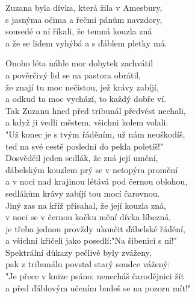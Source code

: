 
Zuzana byla dívka, která žila v Amesbury,\\
s jasnýma očima a řečmi pánům navzdory,\\
sousedé o ní říkali, že temná kouzla zná\\
a že se lidem vyhýbá a s ďáblem pletky má.\\

\begin{large}

Onoho léta náhle mor dobytek zachvátil\\
a pověrčivý lid se na pastora obrátil,\\
že znají tu moc nečistou, jež krávy zabíjí,\\
a odkud ta moc vychází, to každý dobře ví.\\

Tak Zuzanu hned před tribunál předvést nechali,\\
a když ji vedli městem, všichni kolem volali:\\
"Už konec je s tvým řáděním, už nám neuškodíš,\\
teď na své cestě poslední do pekla poletíš!"\\

Dosvědčil jeden sedlák, že zná její umění,\\
ďábelským kouzlem prý se v netopýra promění\\
a v noci nad krajinou létává pod černou oblohou,\\
sedlákům krávy zabíjí tou mocí čarovnou.\\

Jiný zas na kříž přísahal, že její kouzla zná,\\
v noci se v černou kočku mění dívka líbezná,\\
je třeba jednou provždy ukončit ďábelské řádění,\\
a všichni křičeli jako posedlí:"Na šibenici s ní!"\\

Spektrální důkazy pečlivě byly zváženy,\\
pak z tribunálu povstal starý soudce vážený:\\
"Je přece v knize psáno: nenecháš čarodějnici žít\\
a před ďáblovým učením budeš se na pozoru mít!"\\


\end{large}
